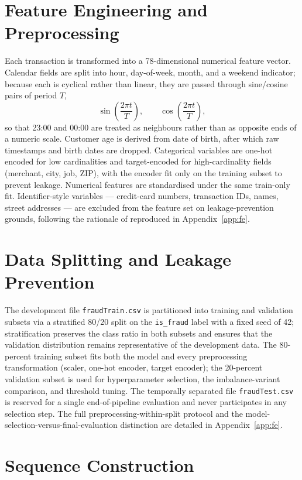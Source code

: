 \documentclass[oneside,12pt,parskip=half,american,numbers=noenddot]{scrreprt}
\begin{document}
\section{Feature Engineering and Preprocessing}
\label{sec:feature_engineering}

Each transaction is transformed into a 78-dimensional numerical feature vector. Calendar fields are split into hour, day-of-week, month, and a weekend indicator; because each is cyclical rather than linear, they are passed through sine/cosine pairs of period $T$,
\[
\sin\!\left(\frac{2\pi t}{T}\right), \qquad \cos\!\left(\frac{2\pi t}{T}\right),
\]
so that 23:00 and 00:00 are treated as neighbours rather than as opposite ends of a numeric scale. Customer age is derived from date of birth, after which raw timestamps and birth dates are dropped. Categorical variables are one-hot encoded for low cardinalities and target-encoded for high-cardinality fields (merchant, city, job, ZIP), with the encoder fit only on the training subset to prevent leakage. Numerical features are standardised under the same train-only fit. Identifier-style variables — credit-card numbers, transaction IDs, names, street addresses — are excluded from the feature set on leakage-prevention grounds, following the rationale of \textcite{Du2026MLFraud} reproduced in Appendix~\ref{app:fe}.

\section{Data Splitting and Leakage Prevention}
\label{sec:data_split}

The development file \texttt{fraudTrain.csv} is partitioned into training and validation subsets via a stratified 80/20 split on the \texttt{is\_fraud} label with a fixed seed of 42; stratification preserves the class ratio in both subsets and ensures that the validation distribution remains representative of the development data. The 80-percent training subset fits both the model and every preprocessing transformation (scaler, one-hot encoder, target encoder); the 20-percent validation subset is used for hyperparameter selection, the imbalance-variant comparison, and threshold tuning. The temporally separated file \texttt{fraudTest.csv} is reserved for a single end-of-pipeline evaluation and never participates in any selection step. The full preprocessing-within-split protocol and the model-selection-versus-final-evaluation distinction are detailed in Appendix~\ref{app:fe}.

\section{Sequence Construction}
\label{sec:sequence_construction}
\end{document}
